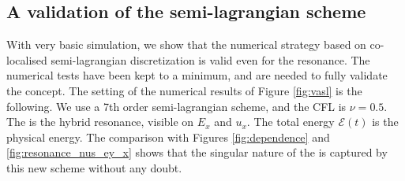 

\FloatBarrier

\subsection{A validation of the semi-lagrangian scheme}

With very basic simulation, we show that the numerical strategy 
based on co-localised semi-lagrangian discretization is valid even for the resonance.
The numerical tests have been kept to a minimum, and  are needed to fully validate
the concept.
The setting of the numerical results of Figure \ref{fig:vasl}
is the following. We use a 7th order semi-lagrangian scheme, and the CFL is $\nu=0.5$.
The  is the hybrid resonance, visible on $E_x$ and $u_x$.
The total energy $\mathcal E(t)$ is the physical energy. 
The comparison with Figures \ref{fig:dependence} and \ref{fig:resonance_nus_ey_x} shows that the 
singular nature of the  is captured by this new scheme without any doubt.


